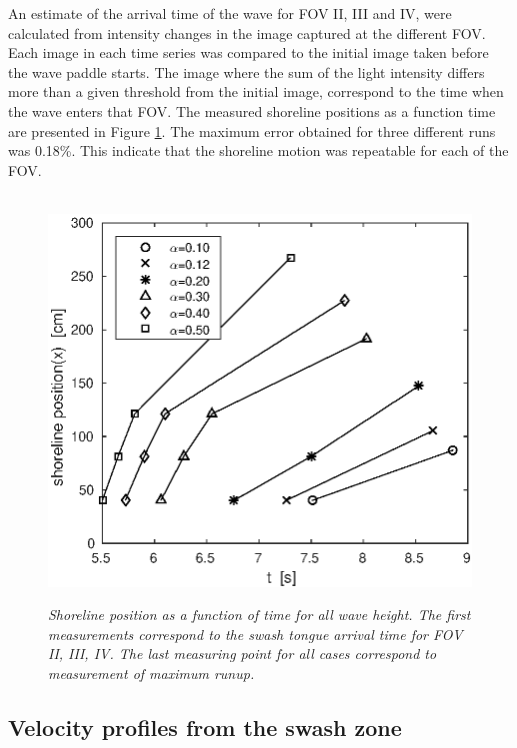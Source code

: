 \documentclass[review, authoryear]{elsarticle}
\begin{document}
An estimate of the arrival time of the wave for FOV II, III and IV, were calculated from intensity changes in the image captured at the different FOV.  Each image in each time series was compared to the initial image taken before the wave paddle starts. The image where the sum of the light intensity differs more than a given threshold from the initial image, correspond to the time when the wave enters that FOV. The measured shoreline positions as a function time are presented in Figure \ref{fig:arr_tim}. The maximum error obtained for three different runs was 0.18\%. This indicate that the shoreline motion was repeatable for each of the FOV.
\begin{figure}
        \centering
        ~ %
                \includegraphics[scale=0.6]{./Figures/shoreline2016.eps}
                \caption{\textit{Shoreline position as a function of time for all wave height. The first measurements correspond to the swash tongue arrival time for FOV II, III, IV. The last measuring point for all cases correspond to measurement of maximum runup. }}
              \label{fig:arr_tim}
      \end{figure}


\subsection{Velocity profiles from the swash zone}
\label{vel_pro}
\end{document}

